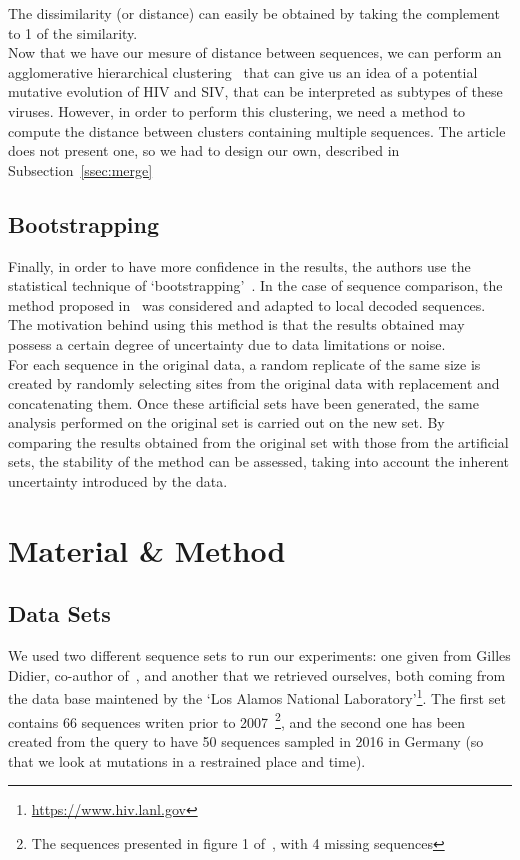 \documentclass[english,13pt,a4paper]{article}
\theoremstyle{definition}
\theoremstyle{remark}
\theoremstyle{defstyle}
\begin{document}
The dissimilarity (or distance) can easily be obtained by taking the complement to 1 of the similarity.\\

Now that we have our mesure of distance between sequences, we can perform an agglomerative hierarchical clustering~\cite{anderberg1973cluster} that can give us an idea of a potential mutative evolution of HIV and SIV, that can be interpreted as subtypes of these viruses. However, in order to perform this clustering, we need a method to compute the distance between clusters containing multiple sequences. The article does not present one, so we had to design our own, described in Subsection~\ref{ssec:merge} 


\subsection{Bootstrapping}

Finally, in order to have more confidence in the results, the authors use the statistical technique of `bootstrapping'~\cite{efron1979bootstrap}. In the case of sequence comparison, the method proposed in~\cite{felsenstein1980confidence} was considered and adapted to local decoded sequences. The motivation behind using this method is that the results obtained may possess a certain degree of uncertainty due to data limitations or noise.\\

For each sequence in the original data, a random replicate of the same size is created by randomly selecting sites from the original data with replacement and concatenating them. Once these artificial sets have been generated, the same analysis performed on the original set is carried out on the new set. By comparing the results obtained from the original set with those from the artificial sets, the stability of the method can be assessed, taking into account the inherent uncertainty introduced by the data.

\section{Material \& Method}\label{sec:mat_method}

\subsection{Data Sets}\label{ssec:DS}

We used two different sequence sets to run our experiments: one given from Gilles Didier, co-author of~\cite{didier_comparing_2007}, and another that we retrieved ourselves, both coming from the data base maintened by the `Los Alamos National Laboratory'\footnote{\url{https://www.hiv.lanl.gov}}. The first set contains 66 sequences writen prior to 2007~\footnote{The sequences presented in figure 1 of~\cite{didier_comparing_2007}, with 4 missing sequences}, and the second one has been created from the query to have 50 sequences sampled in 2016 in Germany (so that we look at mutations in a restrained place and time).
\end{document}
